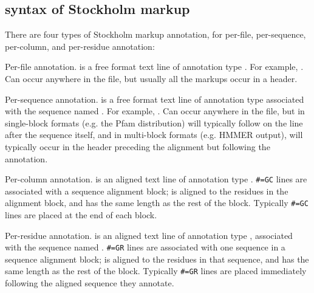 \subsection{syntax of Stockholm markup}

There are four types of Stockholm markup annotation, for per-file,
per-sequence, per-column, and per-residue annotation:

\begin{sreitems}{}
\item [\monob{\#=GF <tag> <s>}]
        Per-file annotation.  is a free format text line
        of annotation type . For example, . Can occur anywhere in the file, but usually
        all the  markups occur in a header.

\item [\monob{\#=GS <seqname> <tag> <s>}]
        Per-sequence annotation.  is a free format text line
        of annotation type  associated with the sequence
        named . For example, . Can occur anywhere
        in the file, but in single-block formats (e.g. the Pfam
        distribution) will typically follow on the line after the
        sequence itself, and in multi-block formats (e.g. HMMER
        output), will typically occur in the header preceding the
        alignment but following the  annotation.

\item [\monob{\#=GC <tag> <..s..>}]
        Per-column annotation.  is an aligned text line
        of annotation type .
        \verb+#=GC+ lines are
        associated with a sequence alignment block; 
        is aligned to the residues in the alignment block, and has
        the same length as the rest of the block.
        Typically \verb+#=GC+ lines are placed at the end of each block.

\item [\monob{\#=GR <seqname> <tag> <..s..>}]
        Per-residue annotation.  is an aligned text line
        of annotation type , associated with the sequence
        named . 
        \verb+#=GR+ lines are 
        associated with one sequence in a sequence alignment block; 
        is aligned to the residues in that sequence, and has
        the same length as the rest of the block.
        Typically
        \verb+#=GR+ lines are placed immediately following the
        aligned sequence they annotate.
\end{sreitems}

